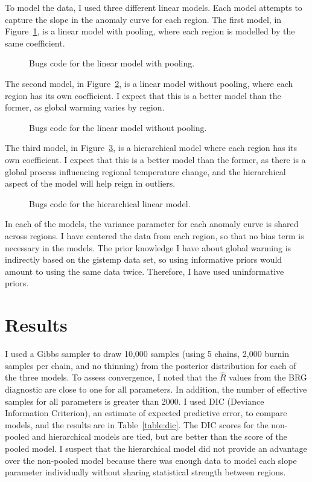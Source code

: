 \documentclass{article}
\begin{document}
To model the data, I used three different linear models.
 Each model attempts to capture the slope in the anomaly curve for each region. 
 The first model, in Figure~\ref{code:pool}, is a linear model with pooling,
 where each region is modelled by the same coefficient.
\begin{figure}[h]
\centering
{}
\caption{Bugs code for the linear model with pooling.}
\label{code:pool}
\end{figure}
The second model, in Figure~\ref{code:nopool}, is a linear model without
pooling, where each region has its own coefficient.
 I expect that this is a better model than the former, as global warming varies by region.
\begin{figure}[h]
\centering
{}
\caption{Bugs code for the linear model without pooling.}
\label{code:nopool}
\end{figure}
The third model, in Figure~\ref{code:hier}, is a hierarchical model where
each region has its own coefficient. 
I expect that this is a better model than the former, as there is a global
process influencing regional temperature change, 
and the hierarchical aspect of the model will help reign in outliers.
\begin{figure}[h]
\centering
{}
\caption{Bugs code for the hierarchical linear model.}
\label{code:hier}
\end{figure}

In each of the models, the variance parameter for each anomaly curve is shared across regions.
I have centered the data from each region, so that no bias term is necessary in the models.
The prior knowledge I have about global warming is indirectly based on the {\sc gistemp} data
set, 
so using informative priors would amount to using the same data twice.
Therefore, I have used uninformative priors.

\section{Results}
I used a Gibbs sampler to draw 10,000 samples (using 5 chains, 2,000 burnin samples per chain, and no thinning) 
from the posterior distribution for each of the three models.
To assess convergence, I noted that the $\hat{R}$ values from the BRG diagnostic
are close to one for all parameters.
 In addition, the number of effective samples for all parameters is greater than 2000.
 I used DIC (Deviance Information Criterion), an estimate of expected predictive error, to compare models, and the results are in Table~\ref{table:dic}.
 The DIC scores for the non-pooled and hierarchical models are tied, but are better than
 the score of the pooled model.
 I suspect that the hierarchical model did not provide an advantage over the non-pooled
 model because there was enough data to model each slope parameter individually without
 sharing statistical strength between regions.
 
\end{document}
